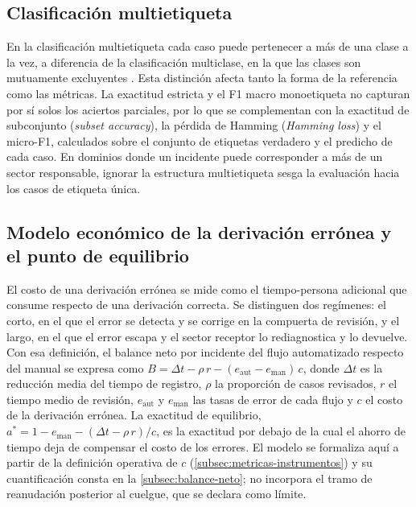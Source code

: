 \subsection{Clasificación multietiqueta}\label{subsec:clasificacion-multietiqueta}

En la clasificación multietiqueta cada caso puede pertenecer a más de una clase a la vez, a diferencia de la clasificación multiclase, en la que las clases son mutuamente excluyentes \parencite{Tsoumakas2007_multilabel}. Esta distinción afecta tanto la forma de la referencia como las métricas. La exactitud estricta y el F1 macro monoetiqueta no capturan por sí solos los aciertos parciales, por lo que se complementan con la exactitud de subconjunto (\emph{subset accuracy}), la pérdida de Hamming (\emph{Hamming loss}) y el micro-F1, calculados sobre el conjunto de etiquetas verdadero y el predicho de cada caso. En dominios donde un incidente puede corresponder a más de un sector responsable, ignorar la estructura multietiqueta sesga la evaluación hacia los casos de etiqueta única.

\subsection{Modelo económico de la derivación errónea y el punto de equilibrio}\label{subsec:modelo-economico}

El costo de una derivación errónea se mide como el tiempo-persona adicional que consume respecto de una derivación correcta. Se distinguen dos regímenes: el corto, en el que el error se detecta y se corrige en la compuerta de revisión, y el largo, en el que el error escapa y el sector receptor lo rediagnostica y lo devuelve. Con esa definición, el balance neto por incidente del flujo automatizado respecto del manual se expresa como \(B = \Delta t - \rho\, r - (e_{\mathrm{aut}} - e_{\mathrm{man}})\, c\), donde \(\Delta t\) es la reducción media del tiempo de registro, \(\rho\) la proporción de casos revisados, \(r\) el tiempo medio de revisión, \(e_{\mathrm{aut}}\) y \(e_{\mathrm{man}}\) las tasas de error de cada flujo y \(c\) el costo de la derivación errónea. La exactitud de equilibrio, \(a^{*} = 1 - e_{\mathrm{man}} - (\Delta t - \rho\, r)/c\), es la exactitud por debajo de la cual el ahorro de tiempo deja de compensar el costo de los errores. El modelo se formaliza aquí a partir de la definición operativa de \(c\) (\autoref{subsec:metricas-instrumentos}) y su cuantificación consta en la \autoref{subsec:balance-neto}; no incorpora el tramo de reanudación posterior al cuelgue, que se declara como límite.

